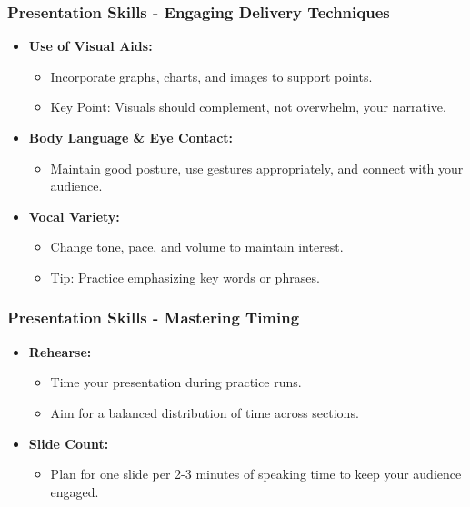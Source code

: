\documentclass[aspectratio=169]{beamer}
\begin{document}
\begin{frame}[fragile]
    \frametitle{Presentation Skills - Engaging Delivery Techniques}
    \begin{itemize}
        \item \textbf{Use of Visual Aids:} 
        \begin{itemize}
            \item Incorporate graphs, charts, and images to support points.
            \item Key Point: Visuals should complement, not overwhelm, your narrative.
        \end{itemize}

        \item \textbf{Body Language \& Eye Contact:} 
        \begin{itemize}
            \item Maintain good posture, use gestures appropriately, and connect with your audience.
        \end{itemize}

        \item \textbf{Vocal Variety:} 
        \begin{itemize}
            \item Change tone, pace, and volume to maintain interest. 
            \item Tip: Practice emphasizing key words or phrases.
        \end{itemize}
    \end{itemize}
\end{frame}

\begin{frame}[fragile]
    \frametitle{Presentation Skills - Mastering Timing}
    \begin{itemize}
        \item \textbf{Rehearse:} 
        \begin{itemize}
            \item Time your presentation during practice runs. 
            \item Aim for a balanced distribution of time across sections.
        \end{itemize}
        
        \item \textbf{Slide Count:} 
        \begin{itemize}
            \item Plan for one slide per 2-3 minutes of speaking time to keep your audience engaged.
        \end{itemize}
    \end{itemize}
\end{frame}
\end{document}
